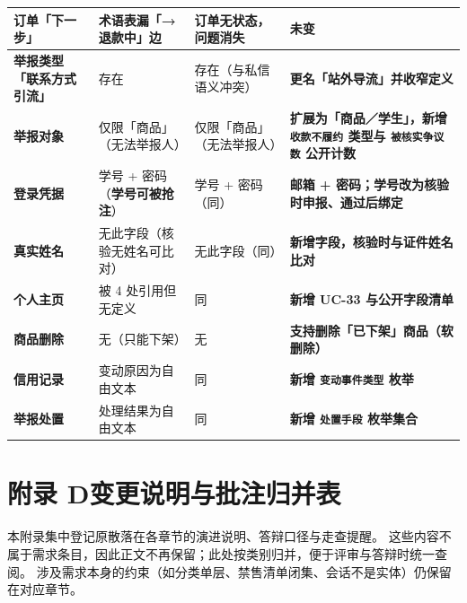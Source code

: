 \documentclass[12pt,a4paper]{ctexart}
\begin{document}
{\begin{longtable}{|p{2.71cm}|p{4.12cm}|p{3.26cm}|p{5.91cm}|}
\hline
订单「下一步」 & 术语表漏「→退款中」边 & 订单无状态，问题消失 & 未变 \\
\hline
\textbf{举报类型「联系方式引流」} & 存在 & 存在（与私信语义冲突） & \textbf{更名「站外导流」并收窄定义} \\
\hline
\textbf{举报对象} & 仅限「商品」（无法举报人） & 仅限「商品」（无法举报人） & \textbf{扩展为「商品／学生」，新增 \texttt{收款不履约} 类型与 \texttt{被核实争议数} 公开计数} \\
\hline
\textbf{登录凭据} & 学号 + 密码（\textbf{学号可被抢注}） & 学号 + 密码（同） & \textbf{邮箱 + 密码；学号改为核验时申报、通过后绑定} \\
\hline
\textbf{真实姓名} & 无此字段（核验无姓名可比对） & 无此字段（同） & \textbf{新增字段，核验时与证件姓名比对} \\
\hline
\textbf{个人主页} & 被 4 处引用但无定义 & 同 & \textbf{新增 UC-33 与公开字段清单} \\
\hline
\textbf{商品删除} & 无（只能下架） & 无 & \textbf{支持删除「已下架」商品（软删除）} \\
\hline
\textbf{信用记录} & 变动原因为自由文本 & 同 & \textbf{新增 \texttt{变动事件类型} 枚举} \\
\hline
\textbf{举报处置} & 处理结果为自由文本 & 同 & \textbf{新增 \texttt{处置手段} 枚举集合} \\
\hline
\end{longtable}
}




\clearpage
\section*{附录 D\quad 变更说明与批注归并表}

本附录集中登记原散落在各章节的演进说明、答辩口径与走查提醒。
这些内容不属于需求条目，因此正文不再保留；此处按类别归并，便于评审与答辩时统一查阅。
涉及需求本身的约束（如分类单层、禁售清单闭集、会话不是实体）仍保留在对应章节。
\end{document}
